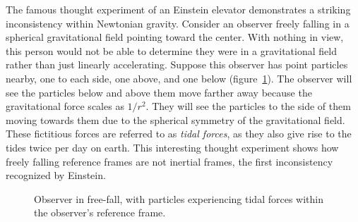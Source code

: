 The famous thought experiment of an Einstein elevator demonstrates a striking inconsistency within Newtonian gravity. Consider an observer freely falling in a spherical gravitational field pointing toward the center. With nothing in view, this person would not be able to determine they were in a gravitational field rather than just linearly accelerating. Suppose this observer has point particles nearby, one to each side, one above, and one below (figure~\ref{fig:tidal_forces}). The observer will see the particles below and above them move farther away because the gravitational force scales as $1/r^2$. They will see the particles to the side of them moving towards them due to the spherical symmetry of the gravitational field. These fictitious forces are referred to as \textit{tidal forces}, as they also give rise to the tides twice per day on earth. This interesting thought experiment shows how freely falling reference frames are not inertial frames, the first inconsistency recognized by Einstein. 
\begin{figure}
    \centering
    \caption{Observer in free-fall, with particles experiencing tidal forces within the observer's reference frame.}
    \label{fig:tidal_forces}
\end{figure}

